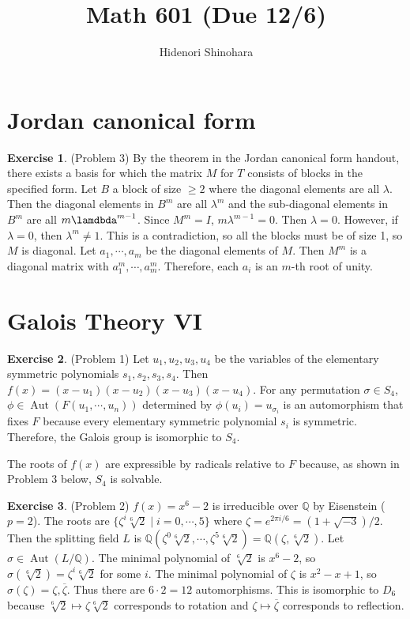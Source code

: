 \documentclass[12pt, psamsfonts]{amsart}
\theoremstyle{definition}
\newtheorem*{exer}{Exercise}
\theoremstyle{remark}
\DeclareMathOperator{\Aut}{Aut}
\numberwithin{equation}{section}
\begin{document}
\title{Math 601 (Due 12/6)}
\author{Hidenori Shinohara}
\maketitle

\tableofcontents

\section{Jordan canonical form}

\begin{exer}{(Problem 3)}
  By the theorem in the Jordan canonical form handout, there exists a basis for which the matrix $M$ for $T$ consists of blocks in the specified form.
  Let $B$ a block of size $\geq 2$ where the diagonal elements are all $\lambda$.
  Then the diagonal elements in $B^m$ are all $\lambda^m$ and the sub-diagonal elements in $B^m$ are all $m\lamdbda^{m - 1}$.
  Since $M^m = I$, $m\lambda^{m - 1} = 0$.
  Then $\lambda = 0$.
  However, if $\lambda = 0$, then $\lambda^m \ne 1$.
  This is a contradiction, so all the blocks must be of size 1, so $M$ is diagonal.
  Let $a_1, \cdots, a_m$ be the diagonal elements of $M$.
  Then $M^m$ is a diagonal matrix with $a_1^m, \cdots, a_m^m$.
  Therefore, each $a_i$ is an $m$-th root of unity.
\end{exer}

\section{Galois Theory VI}


\begin{exer}{(Problem 1)}
  Let $u_1, u_2, u_3, u_4$ be the variables of the elementary symmetric polynomials $s_1, s_2, s_3, s_4$.
  Then $f(x) = (x - u_1)(x - u_2)(x - u_3)(x - u_4)$.
  For any permutation $\sigma \in S_4$, $\phi \in \Aut(F(u_1, \cdots, u_n))$ determined by $\phi(u_i) = u_{\sigma_i}$ is an automorphism that fixes $F$ because every elementary symmetric polynomial $s_i$ is symmetric.
  Therefore, the Galois group is isomorphic to $S_4$.

  The roots of $f(x)$ are expressible by radicals relative to $F$ because, as shown in Problem 3 below, $S_4$ is solvable.
\end{exer}

\begin{exer}{(Problem 2)}
  $f(x) = x^6 - 2$ is irreducible over $\mathbb{Q}$ by Eisenstein ($p = 2$).
  The roots are $\{ \zeta^{i} \sqrt[6]{2} \mid i = 0, \cdots, 5 \}$ where $\zeta = e^{2\pi i / 6} = (1 + \sqrt{-3}) / 2$.
  Then the splitting field $L$ is $\mathbb{Q}(\zeta^0\sqrt[6]{2}, \cdots, \zeta^5\sqrt[6]{2}) = \mathbb{Q}(\zeta, \sqrt[6]{2})$.
  Let $\sigma \in \Aut(L/\mathbb{Q})$.
  The minimal polynomial of $\sqrt[6]{2}$ is $x^6 - 2$, so $\sigma(\sqrt[6]{2}) = \zeta^i\sqrt[6]{2}$ for some $i$.
  The minimal polynomial of $\zeta$ is $x^2 - x + 1$, so $\sigma(\zeta) = \zeta, \overline{\zeta}$.
  Thus there are $6 \cdot 2 = 12$ automorphisms.
  This is isomorphic to $D_6$ because $\sqrt[6]{2} \mapsto \zeta\sqrt[6]{2}$ corresponds to rotation and $\zeta \mapsto \overline{\zeta}$ corresponds to reflection.
\end{exer}
\end{document}
